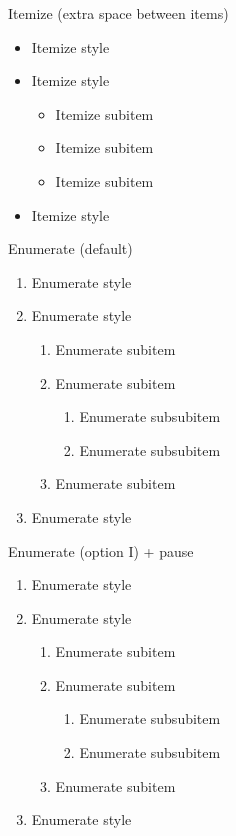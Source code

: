 \documentclass[10pt,t]{beamer}
\begin{document}
\begin{frame}{Itemize}
(extra space between items)
\begin{itemize}
	\itemsep 20pt
	\item Itemize style
	\item Itemize style
	\begin{itemize}
		\itemsep 10pt
		\item Itemize subitem
		\item Itemize subitem
		\item Itemize subitem	
	\end{itemize}
	\item Itemize style
\end{itemize}
\end{frame}




\begin{frame}{Enumerate}
(default)
\begin{enumerate}
	\item Enumerate style
	\item Enumerate style
	\begin{enumerate}
		\item Enumerate subitem
		\item Enumerate subitem
		\begin{enumerate}
			\item Enumerate subsubitem
			\item Enumerate subsubitem
		\end{enumerate}
		\item Enumerate subitem
	\end{enumerate}
	\item Enumerate style
\end{enumerate}
\end{frame}




\begin{frame}{Enumerate}
(option I) + pause
\begin{enumerate}[I]
	\item Enumerate style
	\item Enumerate style
	\begin{enumerate}[I]
		\item Enumerate subitem
		\item Enumerate subitem
		\pause
		\begin{enumerate}[I]
			\item Enumerate subsubitem
			\item Enumerate subsubitem
		\end{enumerate}
		\pause
		\item Enumerate subitem
	\end{enumerate}
	\item Enumerate style
\end{enumerate}
\end{frame}
\end{document}
